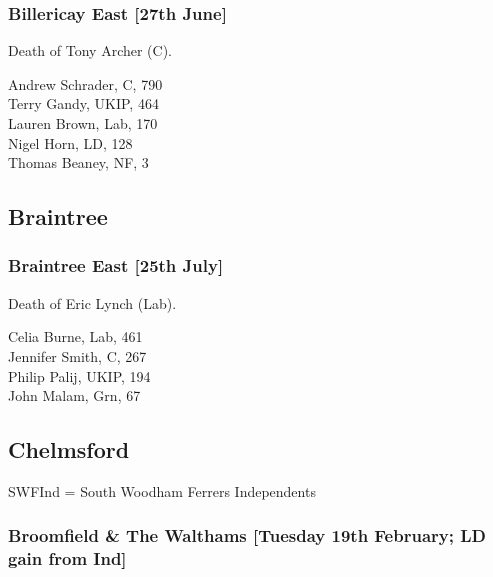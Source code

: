 \documentclass[a4paper,openany,10pt]{book}
\begin{document}
\subsubsection*{Billericay East \hspace*{\fill}\nolinebreak[1]%
\enspace\hspace*{\fill}
[27th June]}


Death of Tony Archer (C).



Andrew Schrader, C, 790\\
Terry Gandy, UKIP, 464\\
Lauren Brown, Lab, 170\\
Nigel Horn, LD, 128\\
Thomas Beaney, NF, 3\\


\subsection*{Braintree}

\subsubsection*{Braintree East \hspace*{\fill}\nolinebreak[1]%
\enspace\hspace*{\fill}
[25th July]}


Death of Eric Lynch (Lab).



Celia Burne, Lab, 461\\
Jennifer Smith, C, 267\\
Philip Palij, UKIP, 194\\
John Malam, Grn, 67\\




\subsection*{Chelmsford}

SWFInd = South Woodham Ferrers Independents

\subsubsection*{Broomfield \& The Walthams \hspace*{\fill}\nolinebreak[1]%
\enspace\hspace*{\fill}
[Tuesday 19th February; LD gain from Ind]}
\end{document}

